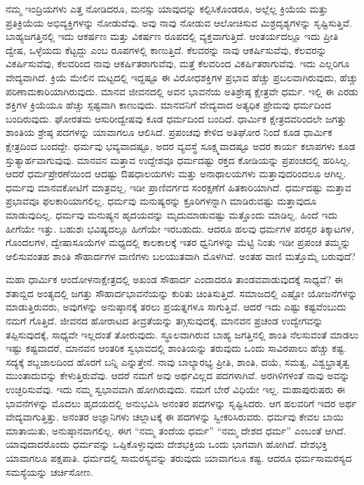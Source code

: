 ನಮ್ಮ ಇಂದ್ರಿಯಗಳು ಎತ್ತ ನೋಡಿದರೂ, ಮನಸ್ಸು ಯಾವುದನ್ನು ಕಲ್ಪಿಸಿಕೊಂಡರೂ, ಅಲ್ಲೆಲ್ಲ ಕ್ರಿಯೆಯ ಮತ್ತು ಪ್ರತಿಕ್ರಿಯೆಯ ಅಭಿವ್ಯಕ್ತಿಗಳನ್ನು ನೋಡುವೆವು. ಅವು ನಾವು ನೋಡುವ ಆಲೋಚಿಸುವ ಮಿಶ್ರದೃಶ್ಯಗಳನ್ನು ಸೃಷ್ಟಿಸುತ್ತಿವೆ. ಬಾಹ್ಯಜಗತ್ತಿನಲ್ಲಿ ಇದು ಆಕರ್ಷಣ ಮತ್ತು ವಿಕರ್ಷಣ ರೂಪದಲ್ಲಿ ವ್ಯಕ್ತವಾಗುತ್ತಿದೆ. ಆಂತರ್ಯದಲ್ಲೂ ಇದು ಪ್ರೀತಿ ದ್ವೇಷ, ಒಳ್ಳೆಯದು ಕೆಟ್ಟದ್ದು ಎಂಬ ರೂಪಗಳಲ್ಲಿ ಕಾಣುತ್ತಿದೆ. ಕೆಲವರನ್ನು ನಾವು ಆಕರ್ಷಿಸುವೆವು, ಕೆಲವರನ್ನು ವಿಕರ್ಷಿಸುವೆವು, ಕೆಲವರಿಂದ ನಾವು ಆಕರ್ಷಿತರಾಗುವೆವು, ಮತ್ತೆ ಕೆಲವರಿಂದ ವಿಕರ್ಷಿತರಾಗುವೆವು. ಇದು ಎಲ್ಲರಿಗೂ ವೇದ್ಯವಾಗಿದೆ. ಕ್ರಿಯೆ ಮೇಲಿನ ಮಟ್ಟದಲ್ಲಿ ಇದ್ದಷ್ಟೂ ಈ ವಿರೋಧಶಕ್ತಿಗಳ ಪ್ರಭಾವ ಹೆಚ್ಚು ಪ್ರಬಲವಾಗಿರುವುದು, ಹೆಚ್ಚು ಪರಿಣಾಮಕಾರಿಯಾಗಿರುವುದು. ಮಾನವ ಜೀವನದಲ್ಲಿ ಅವನ ಭಾವನೆಯ ಅತಿಶ್ರೇಷ್ಠ ಕ್ಷೇತ್ರವೇ ಧರ್ಮ. ಇಲ್ಲಿ ಈ ಎರಡು ಶಕ್ತಿಗಳ ಕ್ರಿಯೆಯೂ ಹೆಚ್ಚು ಸ್ಪಷ್ಟವಾಗಿ ಕಾಣುವುದು. ಮಾನವನಿಗೆ ವೇದ್ಯವಾದ ಅತ್ಯಧಿಕ ಪ್ರೇಮವು ಧರ್ಮದಿಂದ ಬಂದಿರುವುದು. ಘೋರತಮ ಆಸುರೀದ್ವೇಷವು ಕೂಡ ಧರ್ಮದಿಂದ ಬಂದಿದೆ. ಧಾರ್ಮಿಕ ಕ್ಷೇತ್ರದವರಿಂದಲೇ ಜಗತ್ತು ಶಾಂತಿಯ ಶ್ರೇಷ್ಠ ಪದಗಳನ್ನು ಯಾವಾಗಲೂ ಆಲಿಸಿದೆ. ಪ್ರಪಂಚವು ಕೇಳಿದ ಅತಿಘೋರ ನಿಂದೆ ಕೂಡ ಧಾರ್ಮಿಕ ಕ್ಷೇತ್ರದಿಂದ ಬಂದದ್ದೇ. ಧರ್ಮವು ಭವ್ಯವಾದಷ್ಟೂ, ಅದರ ವ್ಯವಸ್ಥೆ ಸೂಕ್ಷ್ಮವಾದಷ್ಟೂ ಅದರ ಕಾರ್ಯ ಕಲಾಪಗಳು ಕೂಡ ಸ್ತುತ್ಯಾರ್ಹವಾಗುವುವು. ಮಾನವನ ಮತ್ತಾವ ಉದ್ದೇಶವೂ ಧರ್ಮದಷ್ಟು ರಕ್ತದ ಕೋಡಿಯನ್ನು ಪ್ರಪಂಚದಲ್ಲಿ ಹರಿಸಿಲ್ಲ. ಆದರೆ ಧರ್ಮಪ್ರೇರಣೆಯಿಂದ ಆದಷ್ಟು ಔಷಧಾಲಯಗಳು ಮತ್ತು ಅನಾಥಾಲಯಗಳು ಮತ್ತಾವುದರಿಂದಲೂ ಆಗಿಲ್ಲ. ಧರ್ಮವು ಮಾನವಕೋಟಿಗೆ ಮಾತ್ರವಲ್ಲ, ಇಡೀ ಪ್ರಾಣಿವರ್ಗದ ಸಂರಕ್ಷಣೆಗೆ ಹಿತಕಾರಿಯಾಗಿದೆ. ಧರ್ಮದಷ್ಟು ಮತ್ತಾವ ಪ್ರಭಾವವೂ ಫಲಕಾರಿಯಾಗಲಿಲ್ಲ. ಧರ್ಮವು ಮನುಷ್ಯರನ್ನು ಕ್ರೂರಿಗಳನ್ನಾಗಿ ಮಾಡಿರುವಷ್ಟು ಮತ್ತಾವುದೂ ಮಾಡುವುದಿಲ್ಲ. ಧರ್ಮವು ಮನುಷ್ಯನ ಹೃದಯವನ್ನು ಮೃದುಮಾಡುವಷ್ಟು ಮತ್ತೊಂದು ಮಾಡಿಲ್ಲ. ಹಿಂದೆ ಇದು ಹೀಗೆಯೇ ಇತ್ತು. ಬಹುಶಃ ಭವಿಷ್ಯದಲ್ಲೂ ಹೀಗೆಯೇ ಇರಬಹುದು. ಆದರೂ ಹಲವು ಧರ್ಮಗಳ ಪರಸ್ಪರ ತಿಕ್ಕಾಟಗಳ, ಗೊಂದಲಗಳ, ದ್ವೇಷಾಸೂಯೆಗಳ ಮಧ್ಯದಲ್ಲಿ ಕಾಲಕಾಲಕ್ಕೆ ಇತರ ಧ್ವನಿಗಳನ್ನು ಮೆಟ್ಟಿ ನಿಂತು ಇಡೀ ಪ್ರಪಂಚ ತಮ್ಮನ್ನು ಆಲಿಸುವಂತಹ ಶಾಂತಿ ಸೌಹಾರ್ದಗಳ ವಾಣಿಗಳು ಬಲಯುತವಾಗಿ ಮೊಳಗಿವೆ. ಅಂತಹ ವಾಣಿ ಮತ್ತೊಮ್ಮೆ ಬರುವುದೆ?


ಮಹಾ ಧಾರ್ಮಿಕ ಆಂದೋಳನಾಕ್ಷೇತ್ರದಲ್ಲಿ ಅಖಂಡ ಸೌಹಾರ್ದ ಎಂದಾದರೂ ತಾಂಡವವಾಡುವುದಕ್ಕೆ ಸಾಧ್ಯವೆ? ಈ ಶತಾಬ್ದಿದ ಅಂತ್ಯದಲ್ಲಿ ಜಗತ್ತು ಸೌಹಾರ್ದಭಾವನೆಯನ್ನು ಕುರಿತು ಚಿಂತಿಸುತ್ತಿದೆ. ಸಮಾಜದಲ್ಲಿ ಎಷ್ಟೋ ಯೋಜನೆಗಳನ್ನು ಮಾಡುತ್ತಿರುವರು, ಅವುಗಳನ್ನು ಅನುಷ್ಠಾನಕ್ಕೆ ತರಲು ಪ್ರಯತ್ನಗಳೂ ಸಾಗುತ್ತಿವೆ. ಆದರೆ ಇದು ಎಷ್ಟು ಕಷ್ಟವೆಂಬುದು ನಮಗೆ ಗೊತ್ತಿದೆ. ಜೀವನದ ಹೋರಾಟದ ತೀವ್ರತೆಯನ್ನು ತಗ್ಗಿಸುವುದಕ್ಕೆ, ಮಾನವನ ಪ್ರಚಂಡ ಉದ್ವೇಗವನ್ನು ತಪ್ಪಿಸುವುದಕ್ಕೆ, ಸಾಧ್ಯವೇ ಇಲ್ಲದಂತೆ ತೋರುವುದು. ಸ್ಥೂಲವಾಗಿರುವ ಬಾಹ್ಯ ಜಗತ್ತಿನಲ್ಲಿ ಶಾಂತಿ ನೆಲಸುವಂತೆ ಮಾಡಲು ಇಷ್ಟು ಕಷ್ಟವಾದರೆ, ಮಾನವನ ಆಂತರಿಕ ಸ್ವಭಾವದಲ್ಲಿ ಶಾಂತಿಯನ್ನು ತರುವುದು ಒಂದು ಸಾವಿರಪಾಲು ಹೆಚ್ಚು ಕಷ್ಟ. ಸದ್ಯಕ್ಕೆ ಶಬ್ದಜಾಲದಿಂದ ಹೊರಗೆ ಬನ್ನಿ ಎನ್ನುತ್ತೇನೆ. ನಾವು ಬಾಲ್ಯಾರಭ್ಯ ಪ್ರೀತಿ, ಶಾಂತಿ, ದಯೆ, ಸಮತ್ವ, ವಿಶ್ವಭ್ರಾತೃತ್ವ ಮುಂತಾದುವನ್ನು ಕೇಳುತ್ತಿರುವೆವು. ಆದರೆ ನಮಗೆ ಅವು ಅರ್ಥವಿಲ್ಲದ ಪದಗಳಾಗಿವೆ. ಅರಗಿಳಿಗಳಂತೆ ನಾವು ಅವನ್ನು ಉಚ್ಛರಿಸುವೆವು. ಇದು ನಮ್ಮ ಸ್ವಭಾವವಾಗಿ ಹೋಗಿರುವುದು. ನಮಗೆ ಬೇರೆ ವಿಧಿಯೇ ಇಲ್ಲ. ಮಹಾಪುರುಷರು ಈ ಭಾವನೆಗಳನ್ನು ಮೊದಲು ಹೃದಯದಲ್ಲಿ ಅನುಭವಿಸಿ ಅನಂತರ ಪದಗಳನ್ನು ಸೃಷ್ಟಿಸಿದರು. ಆಗ ಹಲವರಿಗೆ ಇದರ ಅರ್ಥ ವೇದ್ಯವಾಗುತ್ತಿತ್ತು. ಅನಂತರ ಅಜ್ಞಾನಿಗಳು ಚಲ್ಲಾಟಕ್ಕೆ ಈ ಪದಗಳನ್ನು ಸ್ವೀಕರಿಸಿರುವರು. ಧರ್ಮವು ಕೇವಲ ಬಾಯಿ ಮಾತಾಯಿತು, ಅನುಷ್ಠಾನವಾಗಲಿಲ್ಲ. ಈಗ “ನಮ್ಮ ತಂದೆಯ ಧರ್ಮ” “ನಮ್ಮ ದೇಶದ ಧರ್ಮ” ಎಂಬಂತೆ ಆಗಿದೆ. ಯಾವುದಾದರೊಂದು ಧರ್ಮವನ್ನು ಒಪ್ಪಿಕೊಳ್ಳುವುದು ದೇಶಭಕ್ತಿಯ ಒಂದು ಭಾಗವಾಗಿ ಹೋಗಿದೆ. ದೇಶಭಕ್ತಿ ಯಾವಾಗಲೂ ಪಕ್ಷಪಾತಿ. ಧರ್ಮದಲ್ಲಿ ಸಾಮರಸ್ಯವನ್ನು ತರುವುದು ಯಾವಾಗಲೂ ಕಷ್ಟ. ಆದರೂ ಧರ್ಮಸಾಮರಸ್ಯದ ಸಮಸ್ಯೆಯನ್ನು ಚರ್ಚಿಸೋಣ.

